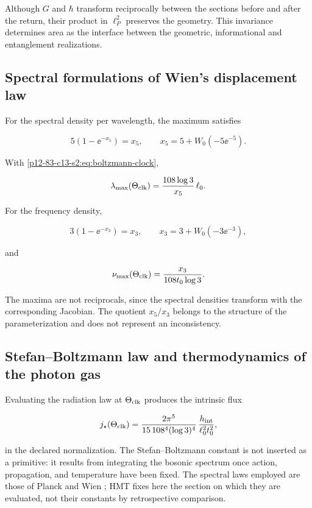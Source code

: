 Although \(G\) and \(\hbar\) transform reciprocally between the sections
before and after the return, their product in \(\ell_P^2\) preserves the
geometry. This invariance determines area as the interface between the
geometric, informational and entanglement realizations.

\subsection{Spectral formulations of Wien's displacement law}

For the spectral density per wavelength, the maximum satisfies

\[
5(1-\ee^{-x_5})=x_5,
\qquad
x_5=5+W_0(-5\ee^{-5}).
\]

With \cref{p12-83-c13-s2:eq:boltzmann-clock},

\begin{equation}
\lambda_{\max}(\Theta_{\rm clk})
=\frac{108\log3}{x_5}\,\ell_0.
\label{p12-83-c13-s2:eq:wien-lambda}
\end{equation}

For the frequency density,

\[
3(1-\ee^{-x_3})=x_3,
\qquad
x_3=3+W_0(-3\ee^{-3}),
\]

and

\begin{equation}
\nu_{\max}(\Theta_{\rm clk})
=\frac{x_3}{108t_0\log3}.
\label{p12-83-c13-s2:eq:wien-frequency}
\end{equation}

The maxima are not reciprocals, since the spectral densities
transform with the corresponding Jacobian. The quotient \(x_5/x_3\)
belongs to the structure of the parameterization and does not represent an
inconsistency.

\subsection{Stefan--Boltzmann law and thermodynamics of the photon gas}

Evaluating the radiation law at \(\Theta_{\rm clk}\) produces the intrinsic flux

\begin{equation}
j_\star(\Theta_{\rm clk})
=\frac{2\pi^5}{15\,108^4(\log3)^4}\,
\frac{h_{\rm int}}{\ell_0^2t_0^2},
\label{p12-83-c13-s2:eq:stefan-hmt}
\end{equation}

in the declared normalization. The Stefan--Boltzmann constant is not inserted as a primitive: it results from integrating the bosonic spectrum once action, propagation, and temperature have been fixed.
The spectral laws employed are those of Planck and Wien \cite{rm:Planck,rm:Wien}; HMT fixes here the section on which they are evaluated, not their constants by retrospective comparison.

